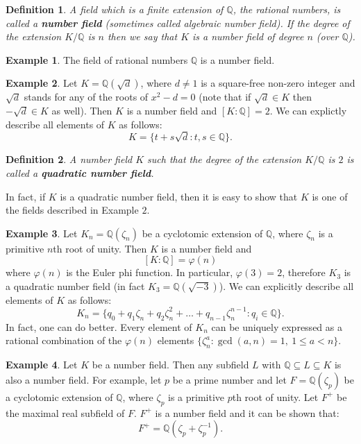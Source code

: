 \documentclass{article}
\newtheorem{defn}{Definition}
\theoremstyle{definition}
\newtheorem{exa}{Example}
\newcommand{\Rats}{\mathbb{Q}}
\begin{document}
\begin{defn}
A field which is a finite extension of $\mathbb{Q}$, the rational numbers, is called a {\bf number field} (sometimes called {\em algebraic number field}). If the degree of the extension $K/\Rats$ is $n$ then we say that $K$ is a number field of degree $n$ (over $\Rats$).\\
\end{defn}

\begin{exa}
The field of rational numbers $\Rats$ is a number field.\\
\end{exa}

\begin{exa}
Let $K=\Rats(\sqrt{d})$, where $d\neq 1$ is a square-free non-zero integer and $\sqrt{d}$ stands for any of the roots of $x^2-d=0$ (note that if $\sqrt{d}\in K$ then $-\sqrt{d}\in K$ as well). Then $K$ is a number field and $[K:\Rats]=2$. We can explictly describe all elements of $K$ as follows:
$$K=\{ t+s\sqrt{d} : t,s \in \Rats \}.$$ 
\end{exa}

\begin{defn}
A number field $K$ such that the degree of the extension $K/\Rats$ is $2$ is called a {\bf quadratic number field}.
\end{defn}

In fact, if $K$ is a quadratic number field, then it is easy to show that $K$ is one of the fields described in Example $2$.

\begin{exa}
Let $K_n=\Rats(\zeta_n)$ be a cyclotomic extension of $\Rats$, where $\zeta_n$ is a primitive $n$th root of unity. Then $K$ is a number field and 
$$[K:\Rats]=\varphi(n)$$
where $\varphi(n)$ is the Euler phi function. In particular, $\varphi(3)=2$, therefore $K_3$ is a quadratic number field (in fact $K_3=\Rats(\sqrt{-3})$). We can explicitly describe all elements of $K$ as follows:
$$K_n=\{ q_0+q_1\zeta_n+q_2\zeta_n^2+\ldots+q_{n-1}\zeta_n^{n-1} : q_i\in \Rats \}.$$
In fact, one can do better. Every element of $K_n$ can be uniquely expressed as a rational combination of the $\varphi(n)$ elements $\{\zeta_n^a : \gcd(a,n)=1,\ 1\leq a < n\}$.
\end{exa}

\begin{exa}
Let $K$ be a number field. Then any subfield $L$ with $\Rats \subseteq L \subseteq K$ is also a number field. For example, let $p$ be a prime number and let $F=\Rats(\zeta_p)$ be a cyclotomic extension of $\Rats$, where $\zeta_p$ is a primitive $p$th root of unity. Let $F^+$ be the maximal real subfield of $F$. $F^{+}$ is a number field and it can be shown that:
$$F^+=\Rats(\zeta_p+\zeta_p^{-1}).$$
\end{exa}
\end{document}
